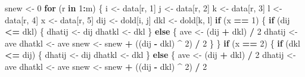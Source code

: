 \documentclass[
  12pt,
]{article}
\newenvironment{Shaded}{\begin{snugshade}}{\end{snugshade}}
\newcommand{\ControlFlowTok}[1]{\textcolor[rgb]{0.13,0.29,0.53}{\textbf{#1}}}
\newcommand{\DecValTok}[1]{\textcolor[rgb]{0.00,0.00,0.81}{#1}}
\newcommand{\NormalTok}[1]{#1}
\newcommand{\OtherTok}[1]{\textcolor[rgb]{0.56,0.35,0.01}{#1}}
\newcommand{\SpecialCharTok}[1]{\textcolor[rgb]{0.81,0.36,0.00}{\textbf{#1}}}
\begin{document}
\begin{Shaded}
\begin{Highlighting}[]
\NormalTok{      snew }\OtherTok{\textless{}{-}} \DecValTok{0}
      \ControlFlowTok{for}\NormalTok{ (r }\ControlFlowTok{in} \DecValTok{1}\SpecialCharTok{:}\NormalTok{m) \{}
\NormalTok{        i }\OtherTok{\textless{}{-}}\NormalTok{ data[r, }\DecValTok{1}\NormalTok{]}
\NormalTok{        j }\OtherTok{\textless{}{-}}\NormalTok{ data[r, }\DecValTok{2}\NormalTok{]}
\NormalTok{        k }\OtherTok{\textless{}{-}}\NormalTok{ data[r, }\DecValTok{3}\NormalTok{]}
\NormalTok{        l }\OtherTok{\textless{}{-}}\NormalTok{ data[r, }\DecValTok{4}\NormalTok{]}
\NormalTok{        x }\OtherTok{\textless{}{-}}\NormalTok{ data[r, }\DecValTok{5}\NormalTok{]}
\NormalTok{        dij }\OtherTok{\textless{}{-}}\NormalTok{ dold[i, j]}
\NormalTok{        dkl }\OtherTok{\textless{}{-}}\NormalTok{ dold[k, l]}
        \ControlFlowTok{if}\NormalTok{ (x }\SpecialCharTok{==} \DecValTok{1}\NormalTok{) \{}
          \ControlFlowTok{if}\NormalTok{ (dij }\SpecialCharTok{\textless{}=}\NormalTok{ dkl) \{}
\NormalTok{            dhatij }\OtherTok{\textless{}{-}}\NormalTok{ dij}
\NormalTok{            dhatkl }\OtherTok{\textless{}{-}}\NormalTok{ dkl}
\NormalTok{          \} }\ControlFlowTok{else}\NormalTok{ \{}
\NormalTok{            ave }\OtherTok{\textless{}{-}}\NormalTok{ (dij }\SpecialCharTok{+}\NormalTok{ dkl) }\SpecialCharTok{/} \DecValTok{2}
\NormalTok{            dhatij }\OtherTok{\textless{}{-}}\NormalTok{ ave}
\NormalTok{            dhatkl }\OtherTok{\textless{}{-}}\NormalTok{ ave}
\NormalTok{            snew }\OtherTok{\textless{}{-}}\NormalTok{ snew }\SpecialCharTok{+}\NormalTok{ ((dij }\SpecialCharTok{{-}}\NormalTok{ dkl) }\SpecialCharTok{\^{}} \DecValTok{2}\NormalTok{) }\SpecialCharTok{/} \DecValTok{2}
\NormalTok{          \}}
\NormalTok{        \}}
        \ControlFlowTok{if}\NormalTok{ (x }\SpecialCharTok{==} \DecValTok{2}\NormalTok{) \{}
          \ControlFlowTok{if}\NormalTok{ (dkl }\SpecialCharTok{\textless{}=}\NormalTok{ dij) \{}
\NormalTok{            dhatij }\OtherTok{\textless{}{-}}\NormalTok{ dij}
\NormalTok{            dhatkl }\OtherTok{\textless{}{-}}\NormalTok{ dkl}
\NormalTok{          \} }\ControlFlowTok{else}\NormalTok{ \{}
\NormalTok{            ave }\OtherTok{\textless{}{-}}\NormalTok{ (dij }\SpecialCharTok{+}\NormalTok{ dkl) }\SpecialCharTok{/} \DecValTok{2}
\NormalTok{            dhatij }\OtherTok{\textless{}{-}}\NormalTok{ ave}
\NormalTok{            dhatkl }\OtherTok{\textless{}{-}}\NormalTok{ ave}
\NormalTok{            snew }\OtherTok{\textless{}{-}}\NormalTok{ snew }\SpecialCharTok{+}\NormalTok{ ((dij }\SpecialCharTok{{-}}\NormalTok{ dkl) }\SpecialCharTok{\^{}} \DecValTok{2}\NormalTok{) }\SpecialCharTok{/} \DecValTok{2}

\end{Highlighting}
\end{Shaded}
\end{document}
